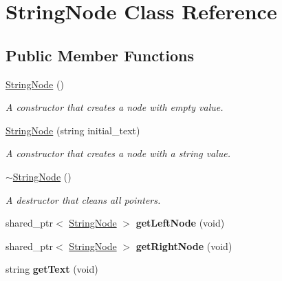 \hypertarget{classStringNode}{}\section{String\+Node Class Reference}
\label{classStringNode}
\subsection*{Public Member Functions}
\begin{DoxyCompactItemize}
\item 
\hyperlink{classStringNode_a3ac1767041e5519e52ada6e7c5ecbbe4}{String\+Node} ()
\begin{DoxyCompactList}\small\item\em A constructor that creates a node with empty value. \end{DoxyCompactList}\item 
\hyperlink{classStringNode_a1f3433ce567eebdbb4e6eca97c473893}{String\+Node} (string initial\+\_\+text)
\begin{DoxyCompactList}\small\item\em A constructor that creates a node with a string value. \end{DoxyCompactList}\item 
\hyperlink{classStringNode_a2d525c434de4a578a3ff53745865130d}{$\sim$\+String\+Node} ()\hypertarget{classStringNode_a2d525c434de4a578a3ff53745865130d}{}\label{classStringNode_a2d525c434de4a578a3ff53745865130d}

\begin{DoxyCompactList}\small\item\em A destructor that cleans all pointers. \end{DoxyCompactList}\item 
shared\+\_\+ptr$<$ \hyperlink{classStringNode}{String\+Node} $>$ {\bfseries get\+Left\+Node} (void)\hypertarget{classStringNode_a26959d3dfb7ca6cbad4826dfe27f24f6}{}\label{classStringNode_a26959d3dfb7ca6cbad4826dfe27f24f6}

\item 
shared\+\_\+ptr$<$ \hyperlink{classStringNode}{String\+Node} $>$ {\bfseries get\+Right\+Node} (void)\hypertarget{classStringNode_a3803fff2b8a3ca379fbfc1535d882fbd}{}\label{classStringNode_a3803fff2b8a3ca379fbfc1535d882fbd}

\item 
string {\bfseries get\+Text} (void)\hypertarget{classStringNode_a43dce00f3299da71994d88ac0d3c48ee}{}\label{classStringNode_a43dce00f3299da71994d88ac0d3c48ee}


\end{DoxyCompactItemize}
